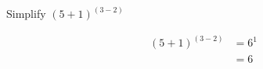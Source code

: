 \documentclass[crop=false,class=book,oneside]{standalone}                      %
\begin{document}
            \hfill
            \begin{minipage}[t]{0.49\textwidth}
                \begin{problem}
                    Simplify $(5+1)^{(3-2)}$
                \end{problem}
                \begin{fsolution}
                    \begin{align*}
                        (5+1)^{(3-2)}&=6^{1}\\
                        &=\boxed{6}\\
                        &\\
                        &
                    \end{align*}
                \end{fsolution}
            \end{minipage}
\end{document}
